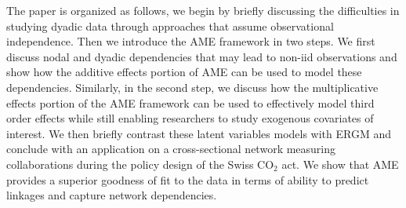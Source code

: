 The paper is organized as follows, we begin by briefly discussing the difficulties in studying dyadic data through approaches that assume observational independence. Then we introduce the AME framework in two steps. We first discuss nodal and dyadic dependencies that may lead to non-iid observations and show how the additive effects portion of AME can be used to model these dependencies. Similarly, in the second step, we discuss how the multiplicative effects portion of the AME framework can be used to effectively model third order effects while still enabling researchers to study exogenous covariates of interest. We then briefly contrast these latent variables models with ERGM and conclude with an application on a cross-sectional network measuring collaborations during the policy design of the Swiss CO$_{2}$ act. We show that AME provides a superior goodness of fit to the data in terms of ability to predict linkages and capture network dependencies. 
\\